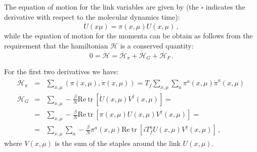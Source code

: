 \documentclass{article}[12pt]
\begin{document}
The equation of motion for the link variables are given by (the $\dot{\square}$ indicates the derivative with respect to the molecular dynamics time):
\begin{equation}
\dot U(x\mu) = \pi(x,\mu) U(x,\mu)\, ,
\end{equation}
while the equation of motion for the momenta can be obtain as follows from the requirement that the hamiltonian
$\mathcal{H}$ is a conserved quantity:
\begin{equation}
0 = \dot{\mathcal{H}} = \dot{\mathcal{H}}_\pi + \dot{\mathcal{H}}_G + \dot{\mathcal{H}_F} \, . \label{HCONS}
\end{equation}

For the first two derivatives we have:
\begin{eqnarray}
\dot{\mathcal{H}}_\pi &=& \sum_{x,\mu} ( \pi(x,\mu) , \dot\pi(x,\mu) ) = T_f \sum_{x,\mu} \sum_a \pi^a(x,\mu) \dot\pi^a(x,\mu) \, \label{HDOTPI}\\
		\dot{\mathcal{H}}_G &=& \sum_{x,\mu} -\frac{\beta}{N} \mathrm{Re\ tr\ } \left[ \dot U(x,\mu) V^\dagger(x,\mu) \right] = \nonumber \\
	&=& \sum_{x,\mu} -\frac{\beta}{N} \mathrm{Re\ tr\ } \left[ \pi(x,\mu) U(x,\mu) V^\dagger(x,\mu) \right] \nonumber = \\
	&=& \sum_{x,\mu} \sum_a -\frac{\beta}{N} \pi^a(x,\mu) \mathrm{Re\ tr\ } \left[ i T^a_f U(x,\mu) V^\dagger(x,\mu) \right] \, , \label{HDOTG}
\end{eqnarray}
where $V(x,\mu)$ is the sum of the staples around the link $U(x,\mu)$.
\end{document}
